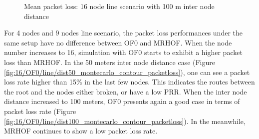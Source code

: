 \begin{figure}[p]
  \centering
    \leavevmode
  \caption{Mean packet loss: 16 node line scenario with 100 m inter node distance}
  \label{fig:pl_16_line_100}
\end{figure}

For 4 nodes and 9 nodes line scenario, the packet loss performances under the same setup have no difference between OF0 and MRHOF. When the node number increases to 16, simulation with OF0 starts to exhibit a higher packet loss than MRHOF. In the 50 meters inter node distance case (Figure \ref{fig:16/OF0/line/dist50_montecarlo_contour_packetloss}), one can see a packet loss rate higher than 15\% in the last few nodes. This indicates the routes between the root and the nodes either broken, or have a low PRR. When the inter node distance increased to 100 meters, OF0 presents again a good case in terms of packet loss rate (Figure \ref{fig:16/OF0/line/dist100_montecarlo_contour_packetloss}). In the meanwhile, MRHOF continues to show a low packet loss rate.   
\newline 

